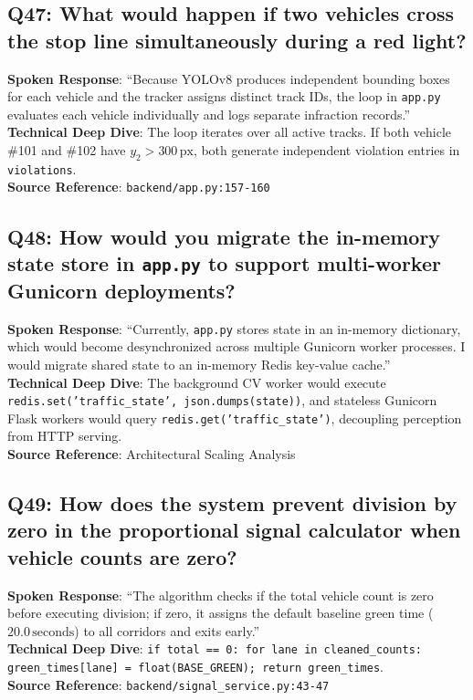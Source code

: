 \subsection*{Q47: What would happen if two vehicles cross the stop line simultaneously during a red light?}
\begin{interviewbox}
\textbf{Spoken Response}: ``Because YOLOv8 produces independent bounding boxes for each vehicle and the tracker assigns distinct track IDs, the loop in \texttt{app.py} evaluates each vehicle individually and logs separate infraction records.''\\
\textbf{Technical Deep Dive}: The loop iterates over all active tracks. If both vehicle \#101 and \#102 have $y_2 > 300\,\text{px}$, both generate independent violation entries in \texttt{violations}.\\
\textbf{Source Reference}: \texttt{backend/app.py:157-160}
\end{interviewbox}

\subsection*{Q48: How would you migrate the in-memory state store in \texttt{app.py} to support multi-worker Gunicorn deployments?}
\begin{interviewbox}
\textbf{Spoken Response}: ``Currently, \texttt{app.py} stores state in an in-memory dictionary, which would become desynchronized across multiple Gunicorn worker processes. I would migrate shared state to an in-memory Redis key-value cache.''\\
\textbf{Technical Deep Dive}: The background CV worker would execute \texttt{redis.set('traffic\_state', json.dumps(state))}, and stateless Gunicorn Flask workers would query \texttt{redis.get('traffic\_state')}, decoupling perception from HTTP serving.\\
\textbf{Source Reference}: Architectural Scaling Analysis
\end{interviewbox}

\subsection*{Q49: How does the system prevent division by zero in the proportional signal calculator when vehicle counts are zero?}
\begin{interviewbox}
\textbf{Spoken Response}: ``The algorithm checks if the total vehicle count is zero before executing division; if zero, it assigns the default baseline green time ($20.0\,\text{seconds}$) to all corridors and exits early.''\\
\textbf{Technical Deep Dive}: \texttt{if total == 0: for lane in cleaned\_counts: green\_times[lane] = float(BASE\_GREEN); return green\_times}.\\
\textbf{Source Reference}: \texttt{backend/signal\_service.py:43-47}
\end{interviewbox}

